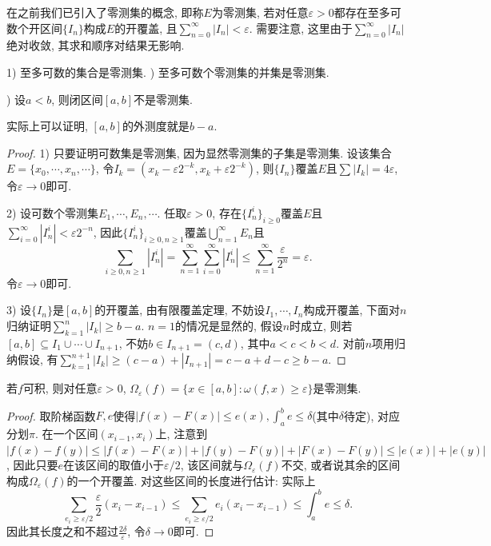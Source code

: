 在之前我们已引入了零测集的概念, 即称$E$为零测集, 若对任意$\varepsilon >0$都存在至多可数个开区间$\{ I_n \}$构成$E$的开覆盖, 且$\sum_{n=0}^{\infty} |I_n|<\varepsilon$. 需要注意, 这里由于$\sum_{n=0}^{\infty} |I_n|$绝对收敛, 其求和顺序对结果无影响. 

\begin{lemma}{}
	1) 至多可数的集合是零测集. ) 至多可数个零测集的并集是零测集. 
	
	) 设$a<b$, 则闭区间$[a,b]$不是零测集. 
\end{lemma}
\begin{remark}
	实际上可以证明, $[a,b]$的外测度就是$b-a$. 
\end{remark}
\begin{proof}
	1) 只要证明可数集是零测集, 因为显然零测集的子集是零测集. 设该集合$E=\{ x_0,\cdots ,x_n,\cdots \}$, 令$I_k=(x_k-\varepsilon 2^{-k},x_k+\varepsilon 2^{-k})$, 则$\{ I_n \}$覆盖$E$且$\sum |I_k| = 4\varepsilon$, 令$\varepsilon \to 0$即可.
	
	2) 设可数个零测集$E_1,\cdots ,E_n,\cdots$. 任取$\varepsilon >0$, 存在$\{ I_n^i \}_{i \geq 0}$覆盖$E$且$\sum_{i=0}^{\infty} |I_n^i| < \varepsilon 2^{-n}$, 因此$\{ I_n^i \}_{i\geq 0,n\geq 1}$覆盖$\bigcup_{n=1}^{\infty} E_n$且$$\sum_{i\geq 0,n\geq 1}|I_n^i| = \sum_{n=1}^{\infty} \sum_{i=0}^{\infty} |I_n^i| \leq \sum_{n=1}^{\infty} \frac{\varepsilon}{2^n} = \varepsilon .$$
	令$\varepsilon \to 0$即可. 
	
	3) 设$\{ I_n \}$是$[a,b]$的开覆盖, 由有限覆盖定理, 不妨设$I_1,\cdots ,I_n$构成开覆盖, 下面对$n$归纳证明$\sum_{k=1}^{n} |I_k| \geq b-a$. $n=1$的情况是显然的, 假设$n$时成立, 则若$[a,b] \subseteq I_1 \cup \cdots \cup I_{n+1}$, 不妨$b \in I_{n+1} = (c,d)$, 其中$a<c<b<d$. 对前$n$项用归纳假设, 有$\sum_{k=1}^{n+1} |I_k| \geq (c-a)+|I_{n+1}| = c-a+d-c \geq b-a$. 
\end{proof}

\begin{lemma}{}
	若$f$可积, 则对任意$\varepsilon >0$, $\Omega _{\varepsilon} (f) = \{ x\in [a,b]:\omega (f,x)\geq \varepsilon \}$是零测集. 
\end{lemma}
\begin{proof}
	取阶梯函数$F,e$使得$|f(x)-F(x)| \leq e(x), \int_a^b e \leq \delta$(其中$\delta$待定), 对应分划$\pi$. 在一个区间$(x_{i-1},x_i)$上, 注意到$|f(x)-f(y)| \leq |f(x)-F(x)| + |f(y)-F(y)| + |F(x)-F(y)| \leq |e(x)|+|e(y)|$, 因此只要$e$在该区间的取值小于$\varepsilon /2$, 该区间就与$\Omega _{\varepsilon}(f)$不交, 或者说其余的区间构成$\Omega _{\varepsilon}(f)$的一个开覆盖. 对这些区间的长度进行估计: 实际上$$\sum_{e_i \geq \varepsilon /2} \frac{\varepsilon}{2} (x_{i}-x_{i-1}) \leq \sum_{e_i \geq \varepsilon /2} e_i (x_{i}-x_{i-1}) \leq \int_a^b e\leq \delta .$$
	因此其长度之和不超过$\frac{2\delta}{\varepsilon}$, 令$\delta \to 0$即可. 
\end{proof}

